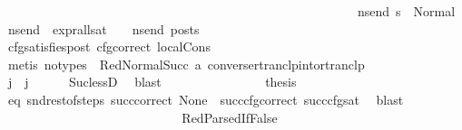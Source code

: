 \begin{isabellebody}
\ \ \ \ \ \ \ \ \ \ \ \ \ \ \ \ \ \ \ \ \ \ \ \ \ \ \ \ \ \ \ \ \ \ \ \ \ \ \ \ \ \ \ \ \ \ \ \ \ \ \ \ \ \ \ \ {\isacharparenleft}{\kern0pt}{\isasymforall}ns{\isacharunderscore}{\kern0pt}end{\isachardot}{\kern0pt}\ s{\isacharprime}{\kern0pt}\ {\isacharequal}{\kern0pt}\ Normal\ ns{\isacharunderscore}{\kern0pt}end\ {\isasymlongrightarrow}\ {\isacharparenleft}{\kern0pt}expr{\isacharunderscore}{\kern0pt}all{\isacharunderscore}{\kern0pt}sat\ {\isasymLambda}\ {\isasymGamma}\ {\isasymOmega}\ ns{\isacharunderscore}{\kern0pt}end{\isacharparenright}{\kern0pt}\ posts{\isacharparenright}{\kern0pt}{\isacharparenright}{\kern0pt}{\isacharparenright}{\kern0pt}{\isacharparenright}{\kern0pt}{\isachardoublequoteclose}\isanewline
\ \ \ \ \ \ \ \ \ \ \ \ \ \ \ \ \isamarkupfalse%
\ cfg{\isacharunderscore}{\kern0pt}satisfies{\isacharunderscore}{\kern0pt}post\ cfg{\isacharunderscore}{\kern0pt}correct\ local{\isachardot}{\kern0pt}Cons\isanewline
\ \ \ \ \ \ \ \ \ \ \ \ \ \ \ \ \isamarkupfalse%
\ {\isacharparenleft}{\kern0pt}metis\ {\isacharparenleft}{\kern0pt}no{\isacharunderscore}{\kern0pt}types{\isacharparenright}{\kern0pt}\ {\isachardoublequoteopen}{}{\isachardoublequoteclose}\ RedNormalSucc\ a{}\ converse{\isacharunderscore}{\kern0pt}rtranclp{\isacharunderscore}{\kern0pt}into{\isacharunderscore}{\kern0pt}rtranclp{\isacharparenright}{\kern0pt}\isanewline
\isanewline
\ \ \ \ \ \ \ \ \ \ \ \ \ \ \isamarkupfalse%
\ {\isachardoublequoteopen}j{\isacharprime}{\kern0pt}{\isacharprime}{\kern0pt}\ {\isacharless}{\kern0pt}\ j{\isachardoublequoteclose}\ \isamarkupfalse%
\ {}\ {}\ \isamarkupfalse%
\ Suc{\isacharunderscore}{\kern0pt}lessD\ \isamarkupfalse%
\ blast\isanewline
\isanewline
\ \ \ \ \ \ \ \ \ \ \ \ \ \ \isamarkupfalse%
\ {\isacharquery}{\kern0pt}thesis\ \isamarkupfalse%
\ eq\ snd{\isacharunderscore}{\kern0pt}rest{\isacharunderscore}{\kern0pt}of{\isacharunderscore}{\kern0pt}steps\ succ{\isacharunderscore}{\kern0pt}correct\ None\ {}\ succ{\isacharunderscore}{\kern0pt}cfg{\isacharunderscore}{\kern0pt}correct\ succ{\isacharunderscore}{\kern0pt}cfg{\isacharunderscore}{\kern0pt}sat\ \isamarkupfalse%
\ blast\isanewline
\ \ \ \ \ \ \ \ \ \ \ \ \isamarkupfalse%
\isanewline
\ \ \ \ \ \ \ \ \ \ \ \ \ \ \isamarkupfalse%
\ {\isacharparenleft}{\kern0pt}RedParsedIfFalse{\isacharparenright}{\kern0pt}\isanewline
\ \ \ \ \ \ \ \ \ \ \ \ \ \ \isamarkupfalse%

\end{isabellebody}
